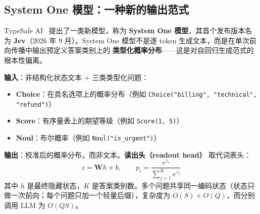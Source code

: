 \subsection{System One 模型：一种新的输出范式}
\label{subsec:system-one-models}

TypeSafe AI~\cite{almeida2026jev} 提出了一类新模型，称为 \textbf{System One 模型}，其首个发布版本名为 \textbf{Jev}（2026 年 9 月）。System One 模型不是逐 token 生成文本，而是在单次前向传播中输出预定义答案类别上的 \textbf{类型化概率分布}——这是对自回归生成范式的根本性偏离。

\textbf{输入}：非结构化状态文本 + 三类类型化问题：
\begin{itemize}
  \item \textbf{Choice}：在具名选项上的概率分布（例如 \texttt{Choice("billing", "technical", "refund")}）
  \item \textbf{Score}：有序量表上的期望等级（例如 \texttt{Score(1, 5)}）
  \item \textbf{Noul}：布尔概率（例如 \texttt{Noul("is\_urgent")}）
\end{itemize}

\textbf{输出}：校准后的概率分布，而非文本。\textbf{读出头（readout head）} 取代词表头：
\begin{equation}
z = \mathbf{W}h + b, \qquad p_i = \frac{e^{z_i}}{\sum_{j=1}^{K} e^{z_j}}
\end{equation}
其中 $h$ 是最终隐藏状态，$K$ 是答案类别数。多个问题共享同一编码状态（状态只做一次前向；每个问题只加一个轻量后缀），复杂度为 $O(S) + O(Q)$，而分别调用 LLM 为 $O(QS)$。

